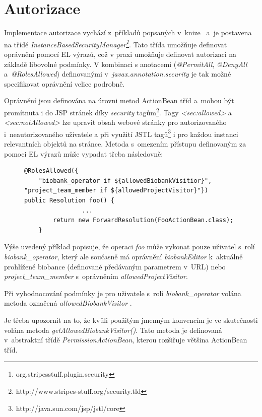 \documentclass[11pt, final, oneside]{fithesis2}
\begin{document}
\section{Autorizace}
Implementace autorizace vychází z~příkladů popsaných v~knize~\cite{Stripes} a~je postavena na třídě \textit{InstanceBasedSecurityManager\footnote{org.stripesstuff.plugin.security}}. Tato třída umožňuje definovat oprávnění pomocí EL výrazů, což v praxi umožňuje definovat autorizaci na základě libovolné podmínky. V kombinaci s anotacemi (\textit{@PermitAll}, \textit{@DenyAll} a~\textit{@RolesAllowed}) definovanými v~\textit{javax.annotation.security} je tak možné specifikovat oprávnění velice podrobně. 

Oprávnění jsou definována na úrovni metod ActionBean tříd a~mohou být promítnuta i do JSP stránek díky \textit{security} tagům\footnote{http://www.stripes-stuff.org/security.tld}. Tagy \textit{<sec:allowed>} a \textit{<sec:notAllowed>} lze upravit obsah webové stránky pro autorizovaného i~neautorizovaného uživatele a při využití JSTL tagů\footnote{http://java.sun.com/jsp/jstl/core} i pro každou instanci relevantních objektů na stránce. 
Metoda s~omezením přístupu definovaným za pomoci EL výrazů může vypadat třeba následovně:

\begin{figure}[h!]
\centering
\begin{lstlisting}[mathescape=false]
@RolesAllowed({
	"biobank_operator if ${allowedBiobankVisitior}", "project_team_member if ${allowedProjectVisitor}"})
public Resolution foo() { 
				...
        return new ForwardResolution(FooActionBean.class);
    }
\end{lstlisting}
\end{figure}

Výše uvedený příklad popisuje, že operaci \textit{foo} může vykonat pouze uživatel s~rolí \textit{biobank\_operator}, který ale současně má oprávnění \textit{biobankEditor} k~aktuálně prohlížené biobance (definované předávaným parametrem v~URL) nebo \textit{project\_team\_member} s~oprávněním \textit{allowedProjectVisitor}.

Při vyhodnocování podmínky je pro uživatele s~rolí \textit{biobank\_operator} volána metoda označená \textit{allowedBiobankVisitor} . 

Je třeba upozornit na to, že kvůli použitým jmenným konvencím je ve skutečnosti volána metoda \textit{getAllowedBiobankVisitor()}. Tato metoda je definovaná v~abstraktní třídě \textit{PermissionActionBean}, kterou rozšiřuje většina ActionBean tříd.
\end{document}
